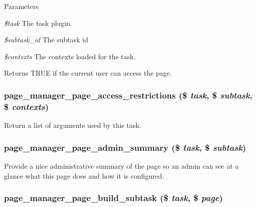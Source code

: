 \begin{DoxyParams}{Parameters}
\item[{\em \$task}]The task plugin. \item[{\em \$subtask\_\-id}]The subtask id \item[{\em \$contexts}]The contexts loaded for the task. \end{DoxyParams}
\begin{DoxyReturn}{Returns}
TRUE if the current user can access the page. 
\end{DoxyReturn}
\hypertarget{page_8inc_aaf41766d0992f11cde5f0614fa8562dc}{
\subsubsection[{page\_\-manager\_\-page\_\-access\_\-restrictions}]{\setlength{\rightskip}{0pt plus 5cm}page\_\-manager\_\-page\_\-access\_\-restrictions (\$ {\em task}, \/  \$ {\em subtask}, \/  \$ {\em contexts})}}
\label{page_8inc_aaf41766d0992f11cde5f0614fa8562dc}
Return a list of arguments used by this task. \hypertarget{page_8inc_a023d4d8c65b426589a2532abc1c12f05}{
\subsubsection[{page\_\-manager\_\-page\_\-admin\_\-summary}]{\setlength{\rightskip}{0pt plus 5cm}page\_\-manager\_\-page\_\-admin\_\-summary (\$ {\em task}, \/  \$ {\em subtask})}}
\label{page_8inc_a023d4d8c65b426589a2532abc1c12f05}
Provide a nice administrative summary of the page so an admin can see at a glance what this page does and how it is configured. \hypertarget{page_8inc_a144d13fecf042467cf2a89bf48784ec3}{
\subsubsection[{page\_\-manager\_\-page\_\-build\_\-subtask}]{\setlength{\rightskip}{0pt plus 5cm}page\_\-manager\_\-page\_\-build\_\-subtask (\$ {\em task}, \/  \$ {\em page})}}
